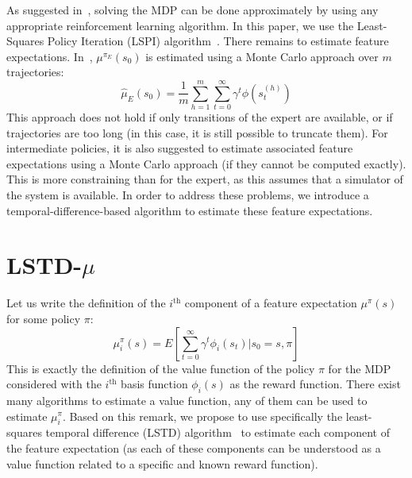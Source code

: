 \documentclass{jfpda2011}
\begin{document}
As suggested in~\citep{abbeel2004apprenticeship}, solving the MDP can be done
approximately by using any appropriate reinforcement learning
algorithm. In this paper, we use the Least-Squares Policy Iteration
(LSPI) algorithm~\citep{lagoudakis2003least}. There remains to estimate
feature expectations. In~\citep{abbeel2004apprenticeship}, $\mu^{\pi_E}(s_0)$ is
estimated using a Monte Carlo approach over $m$ trajectories:
\begin{equation}
  \hat{\mu}_E(s_0) = \frac{1}{m} \sum_{h=1}^m \sum_{t=0}^\infty
  \gamma^t \phi(s_t^{(h)})
\end{equation}
This approach does not hold if only transitions of the expert are
available, or if trajectories are too long (in this case, it is
still possible to truncate them). For intermediate policies, it is
also suggested to estimate associated feature expectations using a
Monte Carlo approach (if they cannot be computed exactly). This is
more constraining than for the expert, as this assumes that a
simulator of the system is available. In order to address these
problems, we introduce a temporal-difference-based algorithm to
estimate these feature expectations.

\section{LSTD-$\mu$}
\label{sec:lstdmu}
Let us write the definition of the $i^\text{th}$ component of a
feature expectation $\mu^\pi(s)$ for some policy $\pi$:
\begin{equation}
  \mu_i^\pi(s) = E[\sum_{t=0}^\infty \gamma^t \phi_i(s_t)|s_0=s,\pi]
  \label{eqn:phi}
\end{equation}
This is exactly the definition of the value function of the policy
$\pi$ for the MDP considered with the $i^\text{th}$ basis function
$\phi_i(s)$ as the reward function. There exist many algorithms to
estimate a value function, any of them can be used to estimate
$\mu_i^\pi$. Based on this remark, we propose to use specifically
the least-squares temporal difference (LSTD)
algorithm~\citep{bradtke1996linear} to estimate each component of the
feature expectation (as each of these components can be understood
as a value function related to a specific and known reward
function).
\end{document}
